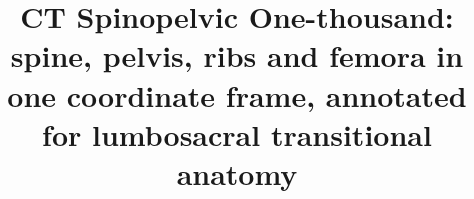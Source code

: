 \documentclass[aapm,mph,amsmath,amssymb,preprint,linenumbers]{revtex4-2}
\begin{document}
\setlength{\dbltextfloatsep}{8pt plus 2pt minus 2pt}
\setlength{\textfloatsep}{8pt plus 2pt minus 2pt}
\setlength{\dblfloatsep}{8pt plus 2pt minus 2pt}
\setlength{\floatsep}{8pt plus 2pt minus 2pt}
\setlength{\intextsep}{8pt plus 2pt minus 2pt}
\setlength{\abovecaptionskip}{1.3pt plus 1pt minus 1pt}
\setlength{\belowcaptionskip}{0pt}

\title{CT Spinopelvic One-thousand: spine, pelvis, ribs and femora in one coordinate frame,
       annotated for lumbosacral transitional anatomy}
\end{document}
